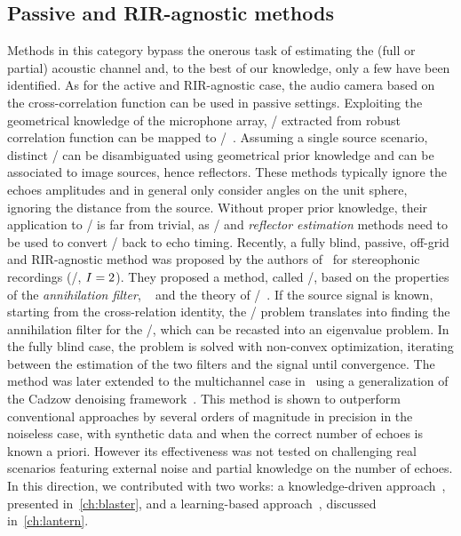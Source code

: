 \subsection{Passive and RIR-agnostic methods}
Methods in this category bypass the onerous task of estimating the (full or partial) acoustic channel and, to the best of our knowledge, only a few have been identified.
As for the active and RIR-agnostic case, the audio camera based on the cross-correlation function can be used in passive settings.
Exploiting the geometrical knowledge of the microphone array, \TDOAs/ extracted from robust correlation function can be mapped to \DOAs/~.
Assuming a single source scenario, distinct \DOAs/ can be disambiguated using geometrical prior knowledge and can be associated to image sources, hence reflectors.
These methods typically ignore the echoes amplitudes and in general only consider angles on the unit sphere, ignoring the distance from the source.
Without proper prior knowledge, their application to \AER/ is far from trivial, as \RooGE/ and \textit{reflector estimation} methods need to be used to convert \DOAs/ back to echo timing.
\mynewline
Recently, a fully blind, passive, off-grid and RIR-agnostic method was proposed by the authors of~ for stereophonic recordings (\ie/, $I=2$).
They proposed a method, called \MULAN/, based on the properties of the \textit{annihilation filter},
~ and the theory of \FRI/~.
If the source signal is known, starting from the cross-relation identity, the \AER/ problem translates into finding the annihilation filter for the \RTFs/, which can be recasted into an eigenvalue problem.
In the fully blind case, the problem is solved with non-convex optimization, iterating between the estimation of the two filters and the signal until convergence.
The method was later extended to the multichannel case in~ using a generalization of the Cadzow denoising framework~.
This method is shown to outperform conventional approaches by several orders of magnitude in precision in the noiseless case, with synthetic data and when the correct number of echoes is known a priori.
However its effectiveness was not tested on challenging real scenarios featuring external noise and partial knowledge on the number of echoes.
\\In this direction, we contributed with two works: a knowledge-driven approach~, presented in~\cref{ch:blaster}, and a learning-based approach~, discussed in~\cref{ch:lantern}.

